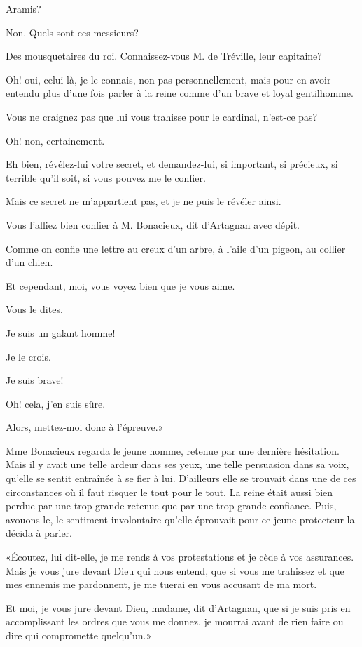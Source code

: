 \speak  Aramis? 

\speak  Non. Quels sont ces messieurs? 

\speak  Des mousquetaires du roi. Connaissez-vous M. de Tréville, leur capitaine? 

\speak  Oh! oui, celui-là, je le connais, non pas personnellement, mais pour en avoir entendu plus d'une fois parler à la reine comme d'un brave et loyal gentilhomme. 

\speak  Vous ne craignez pas que lui vous trahisse pour le cardinal, n'est-ce pas? 

\speak  Oh! non, certainement. 

\speak  Eh bien, révélez-lui votre secret, et demandez-lui, si important, si précieux, si terrible qu'il soit, si vous pouvez me le confier. 

\speak  Mais ce secret ne m'appartient pas, et je ne puis le révéler ainsi. 

\speak  Vous l'alliez bien confier à M. Bonacieux, dit d'Artagnan avec dépit. 

\speak  Comme on confie une lettre au creux d'un arbre, à l'aile d'un pigeon, au collier d'un chien. 

\speak  Et cependant, moi, vous voyez bien que je vous aime. 

\speak  Vous le dites. 

\speak  Je suis un galant homme! 

\speak  Je le crois. 

\speak  Je suis brave! 

\speak  Oh! cela, j'en suis sûre. 

\speak  Alors, mettez-moi donc à l'épreuve.» 

Mme Bonacieux regarda le jeune homme, retenue par une dernière hésitation. Mais il y avait une telle ardeur dans ses yeux, une telle persuasion dans sa voix, qu'elle se sentit entraînée à se fier à lui. D'ailleurs elle se trouvait dans une de ces circonstances où il faut risquer le tout pour le tout. La reine était aussi bien perdue par une trop grande retenue que par une trop grande confiance. Puis, avouons-le, le sentiment involontaire qu'elle éprouvait pour ce jeune protecteur la décida à parler. 

«Écoutez, lui dit-elle, je me rends à vos protestations et je cède à vos assurances. Mais je vous jure devant Dieu qui nous entend, que si vous me trahissez et que mes ennemis me pardonnent, je me tuerai en vous accusant de ma mort. 

\speak  Et moi, je vous jure devant Dieu, madame, dit d'Artagnan, que si je suis pris en accomplissant les ordres que vous me donnez, je mourrai avant de rien faire ou dire qui compromette quelqu'un.» 

